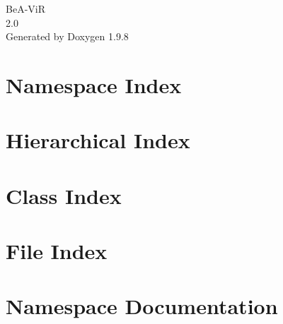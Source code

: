 \documentclass[twoside]{book}
\newcommand{\+}{\discretionary{\mbox{\scriptsize$\hookleftarrow$}}{}{}}
\newcommand{\clearemptydoublepage}{%
    \newpage{\pagestyle{empty}\cleardoublepage}%
  }
\begin{document}
  \raggedbottom
    \hypersetup{pageanchor=false,
                bookmarksnumbered=true,
                pdfencoding=unicode
               }
  \begin{titlepage}
  \vspace*{7cm}
  \begin{center}%
  {\Large Be\+A-\/\+ViR}\\
  [1ex]\large 2.\+0 \\
  \vspace*{1cm}
  {\large Generated by Doxygen 1.9.8}\\
  \end{center}
  \end{titlepage}
  \clearemptydoublepage
  \tableofcontents
  \clearemptydoublepage
  \hypersetup{pageanchor=true}
\chapter{Namespace Index}

\chapter{Hierarchical Index}

\chapter{Class Index}

\chapter{File Index}

\chapter{Namespace Documentation}










\end{document}
